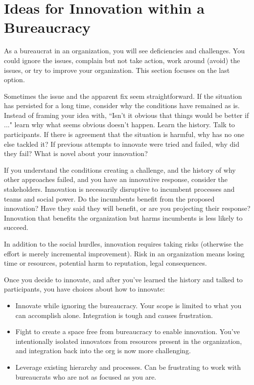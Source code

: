 \section{Ideas for Innovation within a Bureaucracy\label{sec:innovation}}

As a bureaucrat in an organization, you will see deficiencies and challenges. You could ignore the issues, complain but not take action, work around (avoid) the issues, or try to improve your organization. This section focuses on the last option.

Sometimes the issue and the apparent fix seem straightforward. If the situation has persisted for a long time, consider why the conditions have remained as is. 
Instead of framing your idea with, ``Isn't it obvious that things would be better if ..." learn why what seems obvious doesn't happen. 
Learn the history. Talk to participants. If there is agreement that the situation is harmful, why has no one else tackled it? If previous attempts to innovate were tried and failed, why did they fail? What is novel about your innovation?

If you understand the conditions creating a challenge, and the history of why other approaches failed, and you have an innovative response, consider the stakeholders. 
Innovation is necessarily disruptive to incumbent processes and teams and social power. 
Do the incumbents benefit from the proposed innovation? Have they said they will benefit, or are you projecting their response? 
Innovation that benefits the organization but harms incumbents is less likely to succeed. 

In addition to the social hurdles, innovation requires taking risks (otherwise the effort is merely incremental improvement). Risk in an organization means losing time or resources, potential harm to reputation, legal consequences. 

Once you decide to innovate, and after you've learned the history and talked to participants, you have choices about how to innovate:
\begin{itemize}
\item Innovate while ignoring the bureaucracy. Your scope is limited to what you can accomplish alone. Integration is tough and causes frustration.
\item Fight to create a space free from bureaucracy to enable innovation. You've intentionally isolated innovators from resources present in the organization, and integration back into the org is now more challenging. 
\item Leverage existing hierarchy and processes. Can be frustrating to work with bureaucrats who are not as focused as you are.
\end{itemize}


